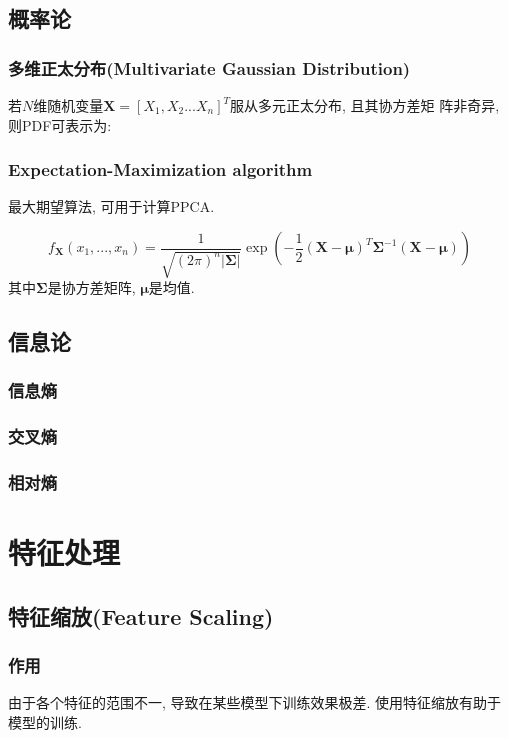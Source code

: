 \documentclass[oneside]{book}
\begin{document}
		\section{概率论}
			\subsection{多维正太分布(Multivariate Gaussian Distribution)}	
				若$N$维随机变量$\boldsymbol{X}= [X_{1}, X_{2} ... X_{n}]^{T}$服从多元正太分布, 且其协方差矩
				阵非奇异, 则PDF可表示为:
			\subsection{Expectation-Maximization algorithm}
				最大期望算法, 可用于计算PPCA.
				
				$$f_{\boldsymbol{X}}(x_{1}, ... , x_{n}) = \frac{1}{\sqrt{(2\pi)^{n}|\boldsymbol{\Sigma}|}}\exp{\left(-\frac{1}{2}(\boldsymbol{X}-\boldsymbol{\mu})^{T}\boldsymbol{\Sigma}^{-1}(\boldsymbol{X}-\boldsymbol{\mu})\right)}$$
				其中$\boldsymbol{\Sigma}$是协方差矩阵, $\boldsymbol{\mu}$是均值.
		
		\section{信息论}
			\subsection{信息熵}
			\subsection{交叉熵}
			\subsection{相对熵}
	\setcounter{chapter}{0}
	\renewcommand{\thechapter}{\arabic{chapter}}
	\chapter{特征处理}
		\section{特征缩放(Feature Scaling)}
			\subsection{作用}
				由于各个特征的范围不一, 导致在某些模型下训练效果极差. 使用特征缩放有助于模型的训练.
\end{document}
